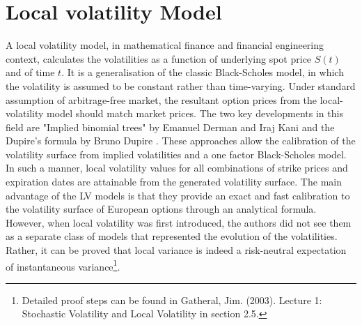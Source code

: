 \section{Local volatility Model}
A local volatility model, in mathematical finance and financial engineering context, calculates the volatilities as a function of underlying spot price $S(t)$ and of time $t$. It is a generalisation of the classic Black-Scholes model, in which the volatility is assumed to be constant rather than time-varying.
Under standard assumption of arbitrage-free market, the resultant option prices from the local-volatility model should match market prices. The two key developments in this field are "Implied binomial trees" by Emanuel Derman and Iraj Kani \parencite{BinoTree} and the Dupire's formula by Bruno Dupire \parencite{Dupire}.  These approaches allow the calibration of the volatility surface from implied volatilities and a one factor Black-Scholes model. In such a manner, local volatility values for all combinations of strike prices and expiration dates are attainable from the generated volatility surface.
The main advantage of the LV models is that they provide an exact and fast calibration to the volatility surface of European options through an analytical formula. However, when local volatility was first introduced, the authors did not see them as a separate class of models that represented the evolution of the volatilities. Rather, it can be proved that local variance is indeed a risk-neutral expectation of instantaneous variance\footnote{Detailed proof steps can be found in Gatheral, Jim. (2003). Lecture 1: Stochastic Volatility and Local Volatility in section 2.5. }. 


